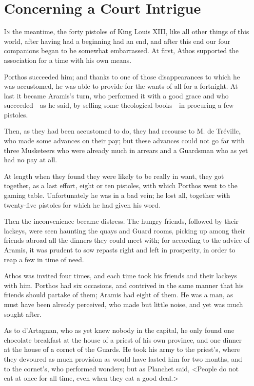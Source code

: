 
\chapter{Concerning a Court Intrigue}

\lettrine[]{I}{n} the meantime, the forty pistoles of King Louis XIII, like all other things of this world, after having had a beginning had an end, and after this end our four companions began to be somewhat embarrassed. At first, Athos supported the association for a time with his own means. 

Porthos succeeded him; and thanks to one of those disappearances to which he was accustomed, he was able to provide for the wants of all for a fortnight. At last it became Aramis's turn, who performed it with a good grace and who succeeded---as he said, by selling some theological books---in procuring a few pistoles. 

Then, as they had been accustomed to do, they had recourse to M. de Tréville, who made some advances on their pay; but these advances could not go far with three Musketeers who were already much in arrears and a Guardsman who as yet had no pay at all. 

At length when they found they were likely to be really in want, they got together, as a last effort, eight or ten pistoles, with which Porthos went to the gaming table. Unfortunately he was in a bad vein; he lost all, together with twenty-five pistoles for which he had given his word. 

Then the inconvenience became distress. The hungry friends, followed by their lackeys, were seen haunting the quays and Guard rooms, picking up among their friends abroad all the dinners they could meet with; for according to the advice of Aramis, it was prudent to sow repasts right and left in prosperity, in order to reap a few in time of need. 

Athos was invited four times, and each time took his friends and their lackeys with him. Porthos had six occasions, and contrived in the same manner that his friends should partake of them; Aramis had eight of them. He was a man, as must have been already perceived, who made but little noise, and yet was much sought after. 

As to d'Artagnan, who as yet knew nobody in the capital, he only found one chocolate breakfast at the house of a priest of his own province, and one dinner at the house of a cornet of the Guards. He took his army to the priest's, where they devoured as much provision as would have lasted him for two months, and to the cornet's, who performed wonders; but as Planchet said, <People do not eat at once for all time, even when they eat a good deal.> 

